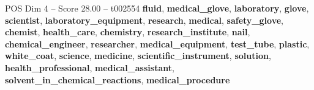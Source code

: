 \begin{textsample}{POS Dim 4 – Score 28.00 – t002554}  \label{ex:f4_pos_032}
\textbf{fluid}, \textbf{medical\_glove}, \textbf{laboratory}, \textbf{glove}, \textbf{scientist}, \textbf{laboratory\_equipment}, \textbf{research}, \textbf{medical}, \textbf{safety\_glove}, \textbf{chemist}, \textbf{health\_care}, \textbf{chemistry}, \textbf{research\_institute}, \textbf{nail}, \textbf{chemical\_engineer}, \textbf{researcher}, \textbf{medical\_equipment}, \textbf{test\_tube}, \textbf{plastic}, \textbf{white\_coat}, \textbf{science}, \textbf{medicine}, \textbf{scientific\_instrument}, \textbf{solution}, \textbf{health\_professional}, \textbf{medical\_assistant}, \textbf{solvent\_in\_chemical\_reactions}, \textbf{medical\_procedure}

\end{textsample}
